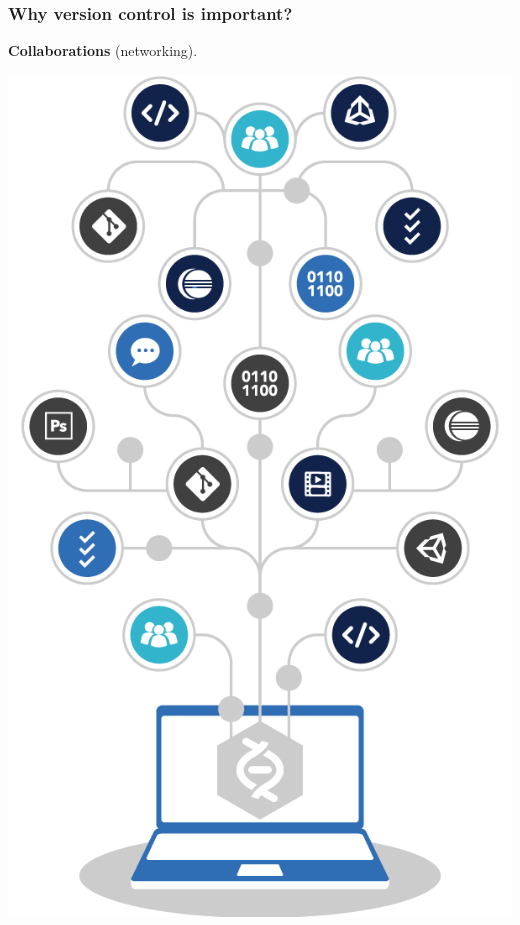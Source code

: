 \documentclass[svgnames]{beamer}
\begin{document}
\begin{frame}
\frametitle{Why version control is important?}
\textbf{Collaborations} (networking).

\begin{center}
\includegraphics[scale=0.15]{img/networking.png}
\end{center}

\end{frame}
\end{document}
